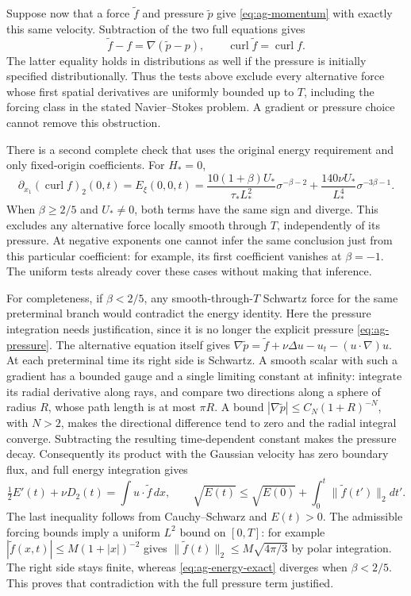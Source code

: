 Suppose now that a force \(\widetilde f\) and pressure \(\widetilde p\)
give \eqref{eq:ag-momentum} with exactly this same velocity.  Subtraction
of the two full equations gives
\[
 \widetilde f-f=\nabla(\widetilde p-p),\qquad
 \operatorname{curl}\widetilde f=\operatorname{curl}f.
\]
The latter equality holds in distributions as well if the pressure is
initially specified distributionally.  Thus the tests above exclude
every alternative force whose first spatial derivatives are uniformly
bounded up to \(T\), including the forcing class in the stated
Navier--Stokes problem.  A gradient or pressure choice cannot remove
this obstruction.

There is a second complete check that uses the original energy
requirement and only fixed-origin coefficients.  For \(H_*=0\),
\begin{equation}\label{eq:ag-second-origin-test}
 \partial_{x_1}(\operatorname{curl}f)_2(0,t)=E_\xi(0,0,t)
 =\frac{10(1+\beta)U_*}{\tau_*L_*^2}\sigma^{-\beta-2}
       +\frac{140\nu U_*}{L_*^4}\sigma^{-3\beta-1}.
\end{equation}
When \(\beta\geq2/5\) and \(U_*\ne0\), both terms have the same
sign and diverge.  This excludes any alternative force locally smooth
through \(T\), independently of its pressure.  At negative exponents
one cannot infer the same conclusion just from this particular
coefficient: for example, its first coefficient vanishes at \(\beta=-1\).
The uniform tests already cover these cases without making that inference.

For completeness, if \(\beta<2/5\), any smooth-through-\(T\)
Schwartz force for the same preterminal branch would contradict the
energy identity.  Here the pressure integration needs justification,
since it is no longer the explicit pressure \eqref{eq:ag-pressure}.
The alternative equation itself gives
\(\nabla\widetilde p=\widetilde f+\nu\Delta u-u_t-(u\cdot\nabla)u\).
At each preterminal time its right side is Schwartz.  A smooth scalar
with such a gradient has a bounded gauge and a single limiting constant
at infinity: integrate its radial derivative along rays, and compare
two directions along a sphere of radius \(R\), whose path length is
at most \(\pi R\).  A bound \(|\nabla\widetilde p|\leq C_N(1+R)^{-N}\),
with \(N>2\), makes the directional difference tend to zero and the
radial integral converge.  Subtracting the resulting time-dependent
constant makes the pressure decay.  Consequently its product with the
Gaussian velocity has zero boundary flux, and full energy integration
gives
\[
 \tfrac12E'(t)+\nu D_2(t)=\int u\cdot\widetilde f\,dx,
 \qquad
 \sqrt{E(t)}\leq\sqrt{E(0)}+\int_0^t\|\widetilde f(t')\|_2dt'.
\]
The last inequality follows from Cauchy--Schwarz and \(E(t)>0\).
The admissible forcing bounds imply a uniform \(L^2\) bound on
\([0,T]\): for example
\(|\widetilde f(x,t)|\leq M(1+|x|)^{-2}\) gives
\(\|\widetilde f(t)\|_2\leq M\sqrt{4\pi/3}\) by polar integration.
The right side stays finite, whereas \eqref{eq:ag-energy-exact}
diverges when \(\beta<2/5\).  This proves that contradiction with
the full pressure term justified.

